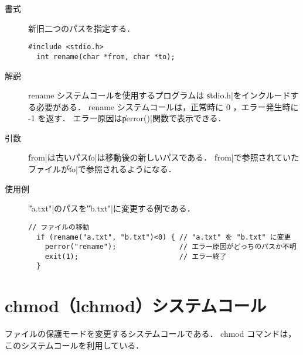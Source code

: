 \begin{description}
\item[書式] 新旧二つのパスを指定する．
\begin{lstlisting}[numbers=none]
  #include <stdio.h>
  int rename(char *from, char *to);
\end{lstlisting}

\item[解説] rename システムコールを使用するプログラムは
\|stdio.h|をインクルードする必要がある．
rename システムコールは，正常時に 0 ，エラー発生時に -1 を返す．
エラー原因は\|perror()|関数で表示できる．

\item[引数] \|from|は古いパス\|to|は移動後の新しいパスである．
\|from|で参照されていたファイルが\|to|で参照されるようになる．

\item[使用例] \|"a.txt"|のパスを\|"b.txt"|に変更する例である．
\begin{lstlisting}[numbers=none]
  // ファイルの移動
  if (rename("a.txt", "b.txt")<0) { // "a.txt" を "b.txt" に変更
    perror("rename");               // エラー原因がどっちのパスか不明
    exit(1);                        // エラー終了
  }
\end{lstlisting}
\end{description}

\section{chmod（lchmod）システムコール}
ファイルの保護モードを変更するシステムコールである．
chmod コマンドは，このシステムコールを利用している．

